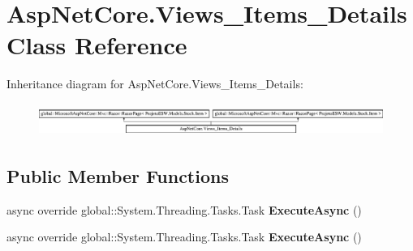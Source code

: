 \hypertarget{class_asp_net_core_1_1_views___items___details}{}\section{Asp\+Net\+Core.\+Views\+\_\+\+Items\+\_\+\+Details Class Reference}
\label{class_asp_net_core_1_1_views___items___details}
Inheritance diagram for Asp\+Net\+Core.\+Views\+\_\+\+Items\+\_\+\+Details\+:\begin{figure}[H]
\begin{center}
\leavevmode
\includegraphics[height=1.083172cm]{class_asp_net_core_1_1_views___items___details}
\end{center}
\end{figure}
\subsection*{Public Member Functions}
\begin{DoxyCompactItemize}
\item 
\mbox{\label{class_asp_net_core_1_1_views___items___details_acdc6cb4e1da1538cb436dfa3cc3aed5d}} 
async override global\+::\+System.\+Threading.\+Tasks.\+Task {\bfseries Execute\+Async} ()
\item 
\mbox{\label{class_asp_net_core_1_1_views___items___details_acdc6cb4e1da1538cb436dfa3cc3aed5d}} 
async override global\+::\+System.\+Threading.\+Tasks.\+Task {\bfseries Execute\+Async} ()
\end{DoxyCompactItemize}
